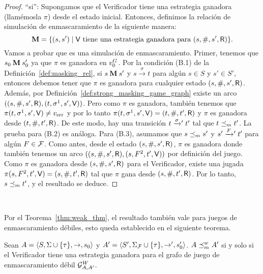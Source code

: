 \begin{proof}
``si'': Supongamos que el Verificador tiene una estrategia ganadora (llamémosla $\pi$) 
desde el estado inicial. Entonces, definimos la relación de simulación de enmascaramiento de la siguiente manera: 
\[
\mathbin{\mathbf{M}} = \{(s,s') \mid \mathsf{V} \text{ tiene una estrategia ganadora para } (s, \#, s', \mathsf{R}) \}.
\]
Vamos a probar que es una simulación de enmascaramiento. 
Primer, tenemos que $s_0 \mathbin{\mathbf{M}} s'_0$ ya que $\pi$ es ganadora en $v_0^G$. Por la condición (B.1) de la Definición~\ref{def:masking_rel}, si
$s \mathbin{\mathbf{M}} s'$ y $s \xrightarrow{\sigma} t$ para algún $s \in S$ y $s' \in S'$, entonces debemos tener que $\pi$ es ganadora para cualquier estado $(s,\#,s',\mathsf{R})$. Además, por Definición~\ref{def:strong_masking_game_graph} existe un arco 
$((s,\#,s',\mathsf{R}), (t,\sigma^1,s',\mathsf{V}))$. 
Pero como $\pi$ es ganadora, también tenemos que $\pi(t,\sigma^1,s',\mathsf{V}) \neq v_{\text{err}}$ y 
por lo tanto $\pi(t,\sigma^1,s',\mathsf{V})=(t, \#, t', \mathsf{R})$ y $\pi$ es ganadora desde  $(t, \#, t', \mathsf{R})$.
De este modo, hay una transición $t \mathrel{{\xrightarrow[]{\sigma}}{}'} t'$ tal que
$t \preceq_{m} t'$. La prueba para (B.2) es análoga. Para (B.3), asumamos que $s \preceq_{m} s'$ y $s' \mathrel{{\xrightarrow[]{F}}{}'} t'$ para algún 
$F \in \mathcal{F}$. 
Como antes, desde el estado $(s,\#,s',\mathsf{R})$, $\pi$ es ganadora donde también tenemos un arco $((s,\#,s',\mathsf{R}), (s,F^2,t',\mathsf{V}))$ por definición del juego. 
Como $\pi$ es ganadora desde $(s,\#,s',\mathsf{R})$ para el Verificador, existe una jugada $\pi(s,F^2,t',\mathsf{V}) = (s,\#,t',\mathsf{R})$ tal que $\pi$ gana desde 
$(s,\#,t',\mathsf{R})$. Por lo tanto, $s \preceq_{m} t'$, y el resultado se deduce.
\qedhere

\end{proof} \\
\fi

Por el Teorema~\ref{thm:weak_thm}, el resultado también vale para juegos de enmascaramiento débiles, esto queda establecido en el siguiente teorema.

\begin{theorem} \label{thm:weak_wingame_strat}
  Sean $A=\langle S, \Sigma \cup \{\tau\}, \rightarrow, s_0 \rangle$ y
  $A'=\langle S', \Sigma_{\mathcal{F}} \cup \{\tau\}, \rightarrow', s'_0 \rangle$.
  $A \preceq^w_{m} A'$ si y solo si el Verificador tiene una estrategia ganadora para el grafo de juego de enmascaramiento débil $\mathcal{G}^W_{A,A'}$.
\end{theorem}

